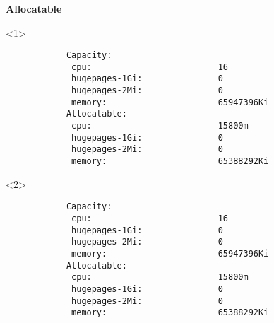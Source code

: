 \documentclass[usenames,dvipsnames, 18pt, compress, aspectratio=169]{beamer}
\begin{document}
\begin{frame}[fragile]{}
    \frametitle{}
    \begin{center}
        \textbf{Allocatable}

        \begin{onlyenv}<1>
            \begin{verbatim}
            Capacity:
             cpu:                         16
             hugepages-1Gi:               0
             hugepages-2Mi:               0
             memory:                      65947396Ki
            Allocatable:
             cpu:                         15800m
             hugepages-1Gi:               0
             hugepages-2Mi:               0
             memory:                      65388292Ki
            \end{verbatim}

            \vspace{-6.0cm}
        \end{onlyenv}

        \begin{onlyenv}<2>
            \color{gray}
            \begin{verbatim}
            Capacity:
             cpu:                         16
             hugepages-1Gi:               0
             hugepages-2Mi:               0
             memory:                      65947396Ki
            Allocatable:
             cpu:                         15800m
             hugepages-1Gi:               0
             hugepages-2Mi:               0
             memory:                      65388292Ki
            \end{verbatim}

            \vspace{-6.0cm}
        \end{onlyenv}
    \end{center}
\end{frame}
\end{document}
